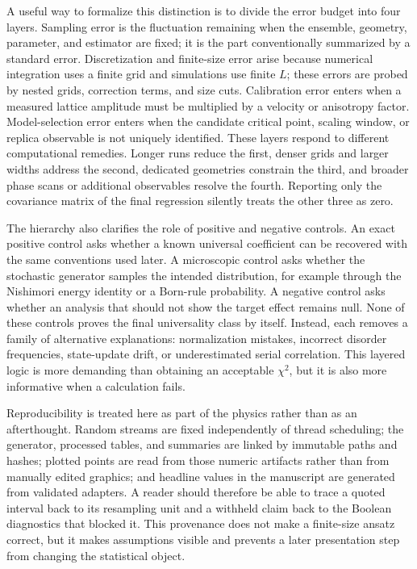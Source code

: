 \documentclass[aps,prb,reprint,superscriptaddress,longbibliography,floatfix]{revtex4-2}
\begin{document}
A useful way to formalize this distinction is to divide the error budget into
four layers.  Sampling error is the fluctuation remaining when the ensemble,
geometry, parameter, and estimator are fixed; it is the part conventionally
summarized by a standard error.  Discretization and finite-size error arise
because numerical integration uses a finite grid and simulations use finite
$L$; these errors are probed by nested grids, correction terms, and size cuts.
Calibration error enters when a measured lattice amplitude must be multiplied
by a velocity or anisotropy factor.  Model-selection error enters when the
candidate critical point, scaling window, or replica observable is not
uniquely identified.  These layers respond to different computational
remedies.  Longer runs reduce the first, denser grids and larger widths address
the second, dedicated geometries constrain the third, and broader phase scans
or additional observables resolve the fourth.  Reporting only the covariance
matrix of the final regression silently treats the other three as zero.

The hierarchy also clarifies the role of positive and negative controls.  An
exact positive control asks whether a known universal coefficient can be
recovered with the same conventions used later.  A microscopic control asks
whether the stochastic generator samples the intended distribution, for
example through the Nishimori energy identity or a Born-rule probability.
A negative control asks whether an analysis that should not show the target
effect remains null.  None of these controls proves the final universality
class by itself.  Instead, each removes a family of alternative explanations:
normalization mistakes, incorrect disorder frequencies, state-update drift,
or underestimated serial correlation.  This layered logic is more demanding
than obtaining an acceptable $\chi^2$, but it is also more informative when a
calculation fails.

Reproducibility is treated here as part of the physics rather than as an
afterthought.  Random streams are fixed independently of thread scheduling;
the generator, processed tables, and summaries are linked by immutable paths
and hashes; plotted points are read from those numeric artifacts rather than
from manually edited graphics; and headline values in the manuscript are
generated from validated adapters.  A reader should therefore be able to
trace a quoted interval back to its resampling unit and a withheld claim back
to the Boolean diagnostics that blocked it.  This provenance does not make a
finite-size ansatz correct, but it makes assumptions visible and prevents a
later presentation step from changing the statistical object.
\end{document}
